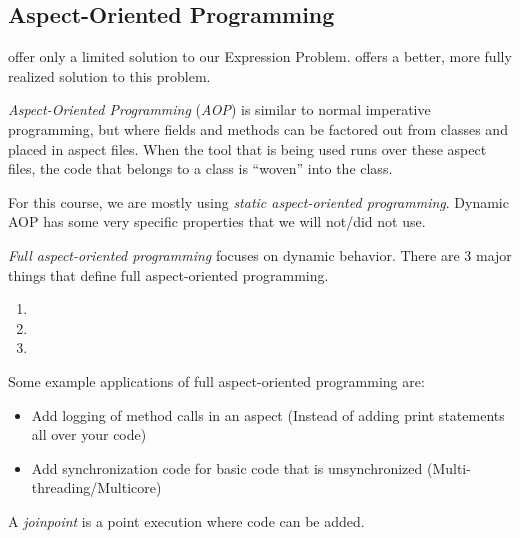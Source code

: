 \subsection{Aspect-Oriented Programming}\label{subsec:Aspect_Oriented_Programming}
 offer only a limited solution to our Expression Problem.
 offers a better, more fully realized solution to this problem.

\begin{definition}\label{def:Aspect_Oriented_Programming}
  \emph{Aspect-Oriented Programming} (\emph{AOP}) is similar to normal imperative programming, but where fields and methods can be factored out from classes and placed in aspect files.
  When the tool that is being used runs over these aspect files, the code that belongs to a class is ``woven'' into the class.

  \begin{remark}
    For this course, we are mostly using \emph{static aspect-oriented programming}.
    Dynamic AOP has some very specific properties that we will not/did not use.
  \end{remark}
\end{definition}

\begin{definition}\label{def:Full_AOP}
  \emph{Full aspect-oriented programming} focuses on dynamic behavior.
  There are 3 major things that define full aspect-oriented programming.
  \begin{enumerate}[noitemsep]
  \item {}
  \item {}
  \item {}
  \end{enumerate}

  Some example applications of full aspect-oriented programming are:
  \begin{itemize}[noitemsep]
  \item Add logging of method calls in an aspect (Instead of adding print statements all over your code)
  \item Add synchronization code for basic code that is unsynchronized (Multi-threading/Multicore)
  \end{itemize}
\end{definition}

\begin{definition}[Joinpoint]\label{def:Joinpoint}
  A \emph{joinpoint} is a point execution where  code can be added.
\end{definition}

